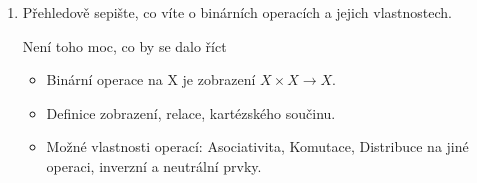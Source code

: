 \documentclass[10pt,a4paper]{article}
\begin{document}
\begin{enumerate}
\begin{itemize}[label=$\circ$]
\item Definice regulární matice (Čtvercová matice, k níž jde sestrojit inverzi)
\item Věta o ekvivalentních definicích regulárních matic
\begin{itemize}
\item $A$ je regulární
\item $rank(A) = n$  
\item $A \sim\sim I_n$
\item $Ax = 0 \implies x = 0$
\end{itemize}
\item platí $A^{-1} A = I_n$
\begin{proof}
Nepřímo, ukažme $A^{-1}$ je regulární:

Sporem: $\exists x, x\neq 0: A^{-1}x = 0$.

$x= I_n x = A A^{-1}x = A0 = 0$ Spor.
\end{proof}
\item Pro R regulární platí $A = B \iff AR = BR \iff RA = RB$
\item $(A^{-1})^{-1} = A$
\item Jak vypočítat inverzi matice?
\begin{proof}
$(A^{-1})^{-1} = I_n (A^{-1})^{-1}  = A A^{-1}(A^{-1})^{-1} = A I_n = A$
\end{proof}
\item součin regulárních matic je regulární
\begin{proof}
$(AB)(B^{-1}A^{-1}) = A(BB^{-1})A^{-1} = I_n$.  Existuje $(AB)^{-1})$, a to $(B^{-1}A^{-1})$.
\end{proof}
\item $(AB)^{-1} = B^{-1}A^{-1}$
Důkaz stejně jako výše.
\item $(A^T)^{-1} =(A^{-1})^T$
\begin{proof}
Využijeme, že $X^T Y^T = (YX)^T$:

$(A^{-1})^T = (A^{-1})^T A^T (A^T)^{-1} =(AA^{-1})^T  (A^T)^{-1} =  I_n (A^T)^{-1} = (A^T)^{-1} $ 
 
\end{proof}
\end{itemize}

\item Přehledově sepište, co víte o binárních operacích a jejich vlastnostech. 

Není toho moc, co by se dalo říct

\begin{itemize}[label=$\circ$]
\item Binární operace na X je zobrazení $X \times X \to X$.
\item Definice zobrazení, relace, kartézského součinu.
\item Možné vlastnosti operací: Asociativita, Komutace, Distribuce na jiné operaci, inverzní a neutrální prvky.


\end{itemize}
\end{enumerate}
\end{document}
